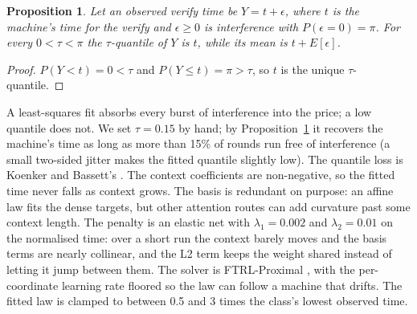 \documentclass[10pt,twocolumn,letterpaper]{article}
\newtheorem{proposition}{Proposition}
\begin{document}
\begin{proposition}\label{prop:3}
Let an observed verify time be $Y = t + \epsilon$, where $t$ is the machine's time for the verify and $\epsilon \geq 0$ is interference with $P(\epsilon = 0) = \pi$. For every $0 < \tau < \pi$ the $\tau$-quantile of $Y$ is $t$, while its mean is $t + E[\epsilon]$.
\end{proposition}

\begin{proof}
$P(Y < t) = 0 < \tau$ and $P(Y \leq t) = \pi > \tau$, so $t$ is the unique $\tau$-quantile.
\end{proof}

A least-squares fit absorbs every burst of interference into the price; a low quantile does not. We set $\tau = 0.15$ by hand; by Proposition~\ref{prop:3} it recovers the machine's time as long as more than 15\% of rounds run free of interference (a small two-sided jitter makes the fitted quantile slightly low). The quantile loss is Koenker and Bassett's \cite{koenker1978regression}. The context coefficients are non-negative, so the fitted time never falls as context grows. The basis is redundant on purpose: an affine law fits the dense targets, but other attention routes can add curvature past some context length. The penalty is an elastic net \cite{zou2005regularization} with $\lambda_{1} = 0.002$ and $\lambda_{2} = 0.01$ on the normalised time: over a short run the context barely moves and the basis terms are nearly collinear, and the L2 term keeps the weight shared instead of letting it jump between them. The solver is FTRL-Proximal \cite{mcmahan2013ad}, with the per-coordinate learning rate floored so the law can follow a machine that drifts. The fitted law is clamped to between 0.5 and 3 times the class's lowest observed time.
\end{document}
